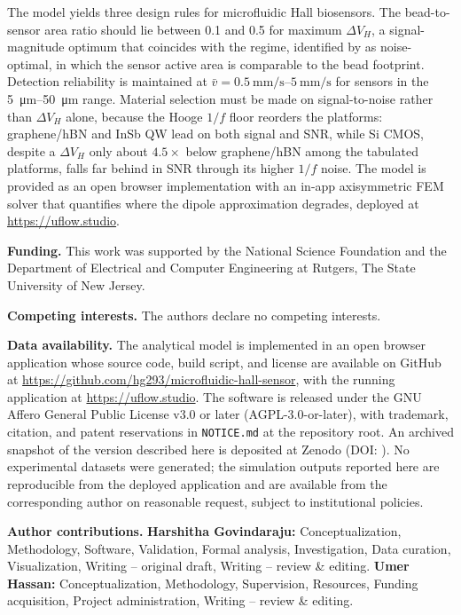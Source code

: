 \documentclass[pdflatex,sn-basic]{sn-jnl}
\theoremstyle{thmstyleone}
\theoremstyle{thmstyletwo}
\theoremstyle{thmstylethree}
\begin{document}
The model yields three design rules for microfluidic Hall biosensors. The bead-to-sensor area ratio should lie between 0.1 and 0.5 for maximum $\Delta V_H$, a signal-magnitude optimum that coincides with the regime, identified by \citet{mihajlovic2007} as noise-optimal, in which the sensor active area is comparable to the bead footprint. Detection reliability is maintained at $\bar{v} = \SIrange{0.5}{5}{\milli\meter\per\second}$ for sensors in the \SIrange{5}{50}{\micro\meter} range. Material selection must be made on signal-to-noise rather than $\Delta V_H$ alone, because the Hooge $1/f$ floor reorders the platforms: graphene/hBN and InSb QW lead on both signal and SNR, while Si CMOS, despite a $\Delta V_H$ only about $4.5\times$ below graphene/hBN among the tabulated platforms, falls far behind in SNR through its higher $1/f$ noise. The model is provided as an open browser implementation with an in-app axisymmetric FEM solver that quantifies where the dipole approximation degrades, deployed at \url{https://uflow.studio}.


\textbf{Funding.} This work was supported by the National Science Foundation %
and the Department of Electrical and Computer Engineering at Rutgers, The State University of New Jersey.

\textbf{Competing interests.} The authors declare no competing interests.

\textbf{Data availability.} The analytical model is implemented in an open browser application whose source code, build script, and license are available on GitHub at \url{https://github.com/hg293/microfluidic-hall-sensor}, with the running application at \url{https://uflow.studio}. The software is released under the GNU Affero General Public License v3.0 or later (AGPL-3.0-or-later), with trademark, citation, and patent reservations in \texttt{NOTICE.md} at the repository root. An archived snapshot of the version described here is deposited at Zenodo (DOI: %
). No experimental datasets were generated; the simulation outputs reported here are reproducible from the deployed application and are available from the corresponding author on reasonable request, subject to institutional policies.

\textbf{Author contributions.} \textbf{Harshitha Govindaraju:} Conceptualization, Methodology, Software, Validation, Formal analysis, Investigation, Data curation, Visualization, Writing -- original draft, Writing -- review \& editing. \textbf{Umer Hassan:} Conceptualization, Methodology, Supervision, Resources, Funding acquisition, Project administration, Writing -- review \& editing.
\end{document}
